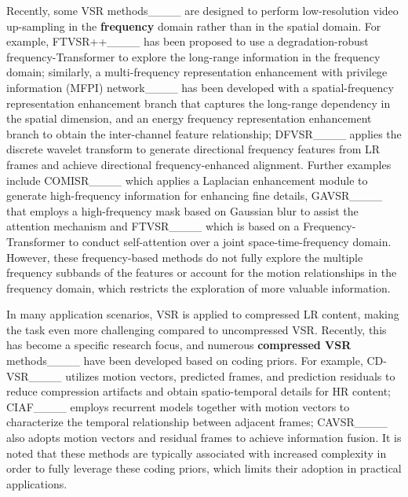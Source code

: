 


Recently, some VSR methods____ are designed to perform low-resolution video up-sampling in the \textbf{frequency} domain rather than in the spatial domain. For example, FTVSR++____ has been proposed to use a degradation-robust frequency-Transformer to explore the long-range information in the frequency domain; similarly, a multi-frequency representation enhancement with privilege information (MFPI) network____ has been developed with a spatial-frequency representation enhancement branch that captures the long-range dependency in the spatial dimension, and an energy frequency representation enhancement branch to obtain the inter-channel feature relationship; DFVSR____ applies the discrete wavelet transform to generate directional frequency features from LR frames and achieve directional frequency-enhanced alignment. Further examples include COMISR____ which applies a Laplacian enhancement module to generate high-frequency information for enhancing fine details, GAVSR____ that employs a high-frequency mask based on Gaussian blur to assist the attention mechanism and FTVSR____ which is based on a Frequency-Transformer to conduct self-attention over a joint space-time-frequency domain. However, these frequency-based methods do not fully explore the multiple frequency subbands of the features or account for the motion relationships in the frequency domain, which restricts the exploration of more valuable information.

In many application scenarios, VSR is applied to compressed LR content, making the task even more challenging compared to uncompressed VSR. Recently, this has become a specific research focus, and numerous \textbf{compressed VSR} methods____ have been developed based on coding priors. For example, CD-VSR____ utilizes motion vectors, predicted frames, and prediction residuals to reduce compression artifacts and obtain spatio-temporal details for HR content; CIAF____ employs recurrent models together with motion vectors to characterize the temporal relationship between adjacent frames; CAVSR____ also adopts motion vectors and residual frames to achieve information fusion. It is noted that these methods are typically associated with increased complexity in order to fully leverage these coding priors, which limits their adoption in practical applications. 

